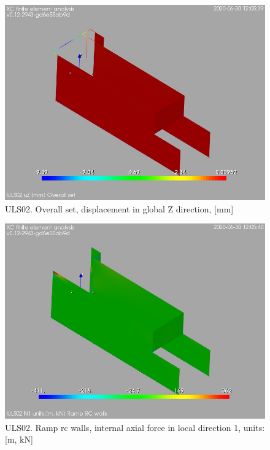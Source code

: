 \begin{figure}
\begin{center}
\includegraphics[width=\linewidth]{ramp_wall/resLC/text/graphics/resSimplLC/lULS02overallSetuZ}
\caption{ULS02. Overall set, displacement in global Z direction, [mm]}
\end{center}
\end{figure}
\begin{figure}
\begin{center}
\includegraphics[width=\linewidth]{ramp_wall/resLC/text/graphics/resSimplLC/lULS02wallsN1}
\caption{ULS02. Ramp rc walls, internal axial force in local direction 1, units:[m, kN]}
\end{center}
\end{figure}
